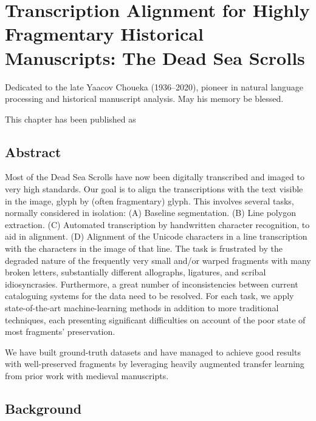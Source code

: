 \chapter{Transcription Alignment for Highly Fragmentary Historical Manu\-scripts: The Dead Sea Scrolls}
\label{ch:algn}
\thispagestyle{empty}
\epigraph{Dedicated to the late Yaacov Choueka (1936--2020), pioneer in natural language
processing and historical manuscript analysis. May his memory be blessed.}{}
\vfill

This chapter has been published as 
\newpage

\section*{Abstract}
Most of the Dead Sea Scrolls have now been digitally transcribed and imaged to
very high standards. Our goal is to align the transcriptions with the text
visible in the image, glyph by (often fragmentary) glyph. 
This involves several tasks, normally considered in isolation: 
(A) Baseline segmentation.  
(B) Line polygon extraction.  (C) Automated transcription by handwritten
character recognition, to aid in alignment.  (D) Alignment of the Unicode
characters in a line transcription with the characters in the image of that
line.  The task is frustrated by the degraded nature of the frequently very
small and/or warped fragments with many broken letters, substantially different
allographs, ligatures, and scribal idiosyncrasies.  Furthermore, a great number
of inconsistencies between current cataloguing systems for the data need to be
resolved.  For each task, we apply state-of-the-art machine-learning methods in
addition to more traditional techniques, each presenting significant
difficulties on account of the poor state of most fragments' preservation.   

We have built ground-truth datasets and have managed to achieve good results
with well-preserved fragments by leveraging heavily augmented transfer learning
from prior work with medieval manuscripts.

\section{Background}

